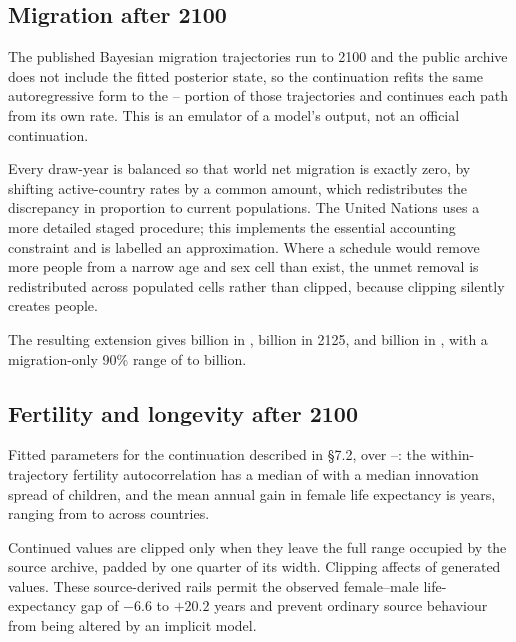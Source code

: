 \subsection{Migration after 2100}

The published Bayesian migration trajectories \citep{azose2015} run to 2100 and
the public archive does not include the fitted posterior state, so the
continuation refits the same autoregressive form to the
\ExtensionFitStart{}--\ExtensionFitEnd{} portion of those trajectories and
continues each path from its own \OfficialBoundaryYear{} rate. This is an
emulator of a model's output, not an official continuation.

Every draw-year is balanced so that world net migration is exactly zero, by
shifting active-country rates by a common amount, which redistributes the
discrepancy in proportion to current populations. The United Nations uses a more
detailed staged procedure; this implements the essential accounting constraint
and is labelled an approximation. Where a schedule would remove more people from
a narrow age and sex cell than exist, the unmet removal is redistributed across
populated cells rather than clipped, because clipping silently creates people.

The resulting extension gives \ExtensionTwentyOneHundred{} billion in
\OfficialBoundaryYear{}, \ExtensionTwentyOneTwentyFive{} billion in 2125, and
\ExtensionTwentyOneFifty{} billion in \ProjectionEndYear{}, with a
migration-only 90\% range of \ExtensionTwentyOneFiftyLow{} to
\ExtensionTwentyOneFiftyHigh{} billion.

\subsection{Fertility and longevity after 2100}
\label{app:rates}

Fitted parameters for the continuation described in \S7.2, over
\ExtensionFitStart{}--\ExtensionFitEnd{}: the within-trajectory fertility
autocorrelation has a median of \ContinuationTfrPhi{} with a median innovation
spread of \ContinuationTfrSigma{} children, and the mean annual gain in female
life expectancy is \ContinuationEZeroDrift{} years, ranging from
\ContinuationEZeroDriftLow{} to \ContinuationEZeroDriftHigh{} across countries.

Continued values are clipped only when they leave the full range occupied by the
source archive, padded by one quarter of its width. Clipping affects
\ContinuationClippedShare{} of generated values. These source-derived rails
permit the observed female--male life-expectancy gap of $-6.6$ to $+20.2$ years
and prevent ordinary source behaviour from being altered by an implicit model.
